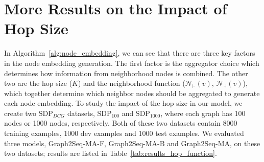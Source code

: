 \documentclass{article} \usepackage{iclr2019_conference,times}
\begin{document}
\section{More Results on the Impact of Hop Size}
\label{App:More Results on Impact of Neighbor-Node Selection}
In Algorithm~\ref{alg:node_embedding}, we can see that there are three key factors in the node embedding generation.
The first factor is the aggregator choice which determines how information from neighborhood nodes is combined. The other two are the hop size ($K$) and the neighborhood function ($\mathcal{N}_{\vdash}(v)$, $\mathcal{N}_{\dashv}(v)$), 
which together determine which neighbor nodes should be aggregated to generate each node embedding.
To study the impact of the hop size in our model, we create two SDP$_{DCG}$ datasets, SDP$_{100}$ and SDP$_{1000}$, where each graph has 100 nodes or 1000 nodes, respectively.
Both of these two datasets contain 8000 training examples, 1000 dev examples and 1000 test examples. We evaluated three models, Graph2Seq-MA-F, Graph2Seq-MA-B and Graph2Seq-MA, on these two datasets; results are listed in Table~\ref{tab:results_hop_function}.
\end{document}
